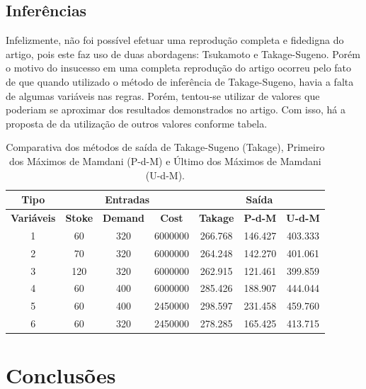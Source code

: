 \documentclass[courier]{uninove-ppgi}
\begin{document}
		\section{Inferências}
		 
		Infelizmente, não foi possível efetuar uma reprodução completa e fidedigna do artigo, pois este faz uso de duas abordagens: Tsukamoto e Takage-Sugeno. Porém o motivo do insucesso em uma completa reprodução do artigo ocorreu pelo fato de que quando utilizado o método de inferência de Takage-Sugeno, havia a falta de algumas variáveis nas regras. Porém, tentou-se utilizar de valores que poderiam se aproximar dos resultados demonstrados no artigo. Com isso, há a proposta de da utilização de outros valores conforme tabela.
		
		\begin{table}[ht!]
		    \centering
		    \begin{tabular}{|c||c|c|c||c|c|c|} \hline
		        \textbf{Tipo} &  \multicolumn{3}{c||}{\textbf{Entradas}} & \multicolumn{3}{c|}{\textbf{Saída}} \\
		        \hline \hline
		        \textbf{Variáveis} & \textbf{Stoke} & \textbf{Demand} & \textbf{Cost} & \textbf{Takage} & \textbf{P-d-M} & \textbf{U-d-M} \\ \hline
		        1 & 60 & 320 & 6000000 & 266.768 & 146.427 & 403.333 \\ \hline
		        2 & 70 & 320 & 6000000 & 264.248 & 142.270 & 401.061 \\ \hline
		        3 & 120 & 320 & 6000000 & 262.915 & 121.461 & 399.859 \\ \hline
		        4 & 60 & 400 & 6000000 & 285.426 & 188.907 & 444.044 \\ \hline
		        5 & 60 & 400 & 2450000 & 298.597 & 231.458 & 459.760 \\ \hline
		        6 & 60 & 320 & 2450000 & 278.285 & 165.425 & 413.715 \\ \hline
		    \end{tabular}
		    \caption{Comparativa dos métodos de saída de Takage-Sugeno (Takage), Primeiro dos Máximos de Mamdani (P-d-M) e Último dos Máximos de Mamdani (U-d-M).}
		    \label{tab:my_label}
		\end{table}
		
	\chapter{Conclusões}
    
\end{document}
